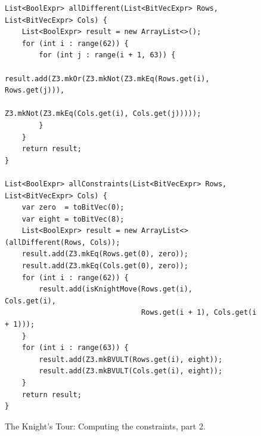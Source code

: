 \begin{figure}[!ht]
\centering
\begin{verbatim}
List<BoolExpr> allDifferent(List<BitVecExpr> Rows, List<BitVecExpr> Cols) {
    List<BoolExpr> result = new ArrayList<>();
    for (int i : range(62)) {
        for (int j : range(i + 1, 63)) {
            result.add(Z3.mkOr(Z3.mkNot(Z3.mkEq(Rows.get(i), Rows.get(j))),
                               Z3.mkNot(Z3.mkEq(Cols.get(i), Cols.get(j)))));
        }
    }
    return result;
}

List<BoolExpr> allConstraints(List<BitVecExpr> Rows, List<BitVecExpr> Cols) {
    var zero  = toBitVec(0);
    var eight = toBitVec(8);
    List<BoolExpr> result = new ArrayList<>(allDifferent(Rows, Cols));
    result.add(Z3.mkEq(Rows.get(0), zero));
    result.add(Z3.mkEq(Cols.get(0), zero));
    for (int i : range(62)) {
        result.add(isKnightMove(Rows.get(i),     Cols.get(i),
                                Rows.get(i + 1), Cols.get(i + 1)));
    }
    for (int i : range(63)) {
        result.add(Z3.mkBVULT(Rows.get(i), eight));
        result.add(Z3.mkBVULT(Cols.get(i), eight));
    }
    return result;
}
\end{verbatim}
\vspace*{-0.3cm}
\caption{The Knight's Tour: Computing the constraints, part 2.}
\label{fig:Knight's Tour with Z3.ipynb-1b}
\end{figure}



